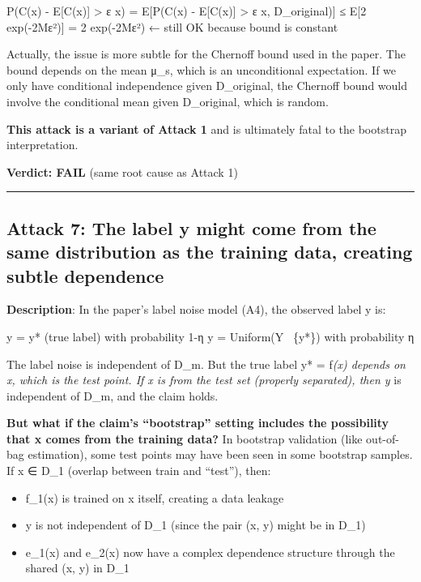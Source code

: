 \documentclass[
  12pt,
]{article}
\providecommand{\tightlist}{%
  \setlength{\itemsep}{0pt}\setlength{\parskip}{0pt}}
\begin{document}
P(\textbar C(x) - E{[}C(x){]}\textbar{} \textgreater{} ε \textbar{} x) =
E{[}P(\textbar C(x) - E{[}C(x){]}\textbar{} \textgreater{} ε \textbar{}
x, D\_original){]} ≤ E{[}2 exp(-2Mε²){]} = 2 exp(-2Mε²) ← still OK
because bound is constant

Actually, the issue is more subtle for the Chernoff bound used in the
paper. The bound depends on the mean μ\_s, which is an unconditional
expectation. If we only have conditional independence given D\_original,
the Chernoff bound would involve the conditional mean given D\_original,
which is random.

\textbf{This attack is a variant of Attack 1} and is ultimately fatal to
the bootstrap interpretation.

\textbf{Verdict: FAIL} (same root cause as Attack 1)

\begin{center}\rule{0.5\linewidth}{0.5pt}\end{center}

\subsection{Attack 7: The label y might come from the same distribution
as the training data, creating subtle
dependence}\label{attack-7-the-label-y-might-come-from-the-same-distribution-as-the-training-data-creating-subtle-dependence}

\textbf{Description}: In the paper's label noise model (A4), the
observed label y is:

y = y* (true label) with probability 1-η y = Uniform(Y ~\{y*\}) with
probability η

The label noise is independent of D\_m. But the true label y* =
f\emph{(x) depends on x, which is the test point. If x is from the test
set (properly separated), then y} is independent of D\_m, and the claim
holds.

\textbf{But what if the claim's ``bootstrap'' setting includes the
possibility that x comes from the training data?} In bootstrap
validation (like out-of-bag estimation), some test points may have been
seen in some bootstrap samples. If x ∈ D\_1 (overlap between train and
``test''), then:

\begin{itemize}
\tightlist
\item
  f\_1(x) is trained on x itself, creating a data leakage
\item
  y is not independent of D\_1 (since the pair (x, y) might be in D\_1)
\item
  e\_1(x) and e\_2(x) now have a complex dependence structure through
  the shared (x, y) in D\_1
\end{itemize}
\end{document}
